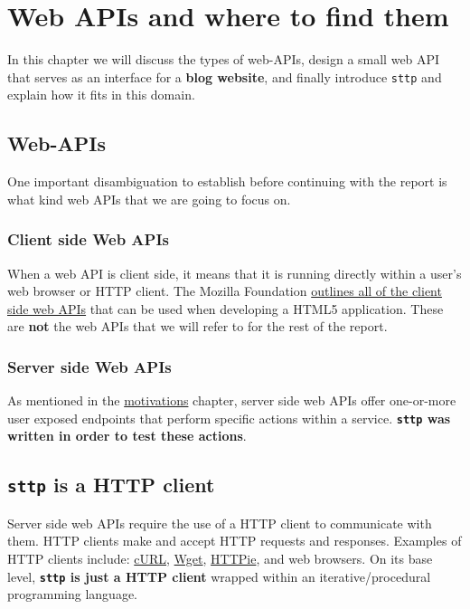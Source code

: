 \chapter{Web APIs and where to find them}

In this chapter we will discuss the types of web-APIs, design a small web API that serves as an interface for a \textbf{blog website}, and finally introduce \verb|sttp| and explain how it fits in this domain.

\section{Web-APIs}

One important disambiguation to establish before continuing with the report is what kind web APIs that we are going to focus on.

\subsection{Client side Web APIs}

When a web API is client side, it means that it is running directly within a user's web browser or HTTP client. The Mozilla Foundation \href{https://developer.mozilla.org/en-US/docs/Web/API}{outlines all of the client side web APIs} that can be used when developing a HTML5 application. These are \textbf{not} the web APIs that we will refer to for the rest of the report.

\subsection{Server side Web APIs}

As mentioned in the \hyperref[chap:motivations]{motivations} chapter, server side web APIs offer one-or-more user exposed endpoints that perform specific actions within a service. \cprotect\textbf{\verb|sttp| was written in order to test these actions}.

\cprotect\section{\verb|sttp| is a HTTP client}
\label{sec:meet-sttp-http-clients}

Server side web APIs require the use of a HTTP client to communicate with them. HTTP clients make and accept HTTP requests and responses. Examples of HTTP clients include: \href{https://github.com/curl/curl}{cURL}, \href{https://www.gnu.org/software/wget/}{Wget}, \href{https://httpie.io/}{HTTPie}, and web browsers. On its base level, \cprotect\textbf{\verb|sttp| is just a HTTP client} wrapped within an iterative/procedural programming language.

